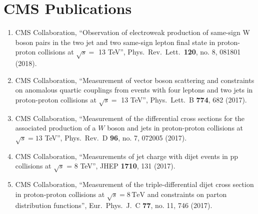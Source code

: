 \section*{CMS Publications}%
\begin{enumerate}
\item CMS Collaboration, ``Observation of electroweak production of same-sign W boson pairs in the two jet and two same-sign lepton final state in proton-proton collisions at $\sqrt{s} = $ 13 TeV'', Phys.\ Rev.\ Lett.\  {\bf 120}, no. 8, 081801 (2018).

\item CMS Collaboration, ``Measurement of vector boson scattering and constraints on anomalous quartic couplings from events with four leptons and two jets in proton-proton collisions at $\sqrt{s}=$ 13 TeV'', Phys.\ Lett.\ B {\bf 774}, 682 (2017).

\item CMS Collaboration, ``Measurement of the differential cross sections for the associated production of a $W$ boson and jets in proton-proton collisions at $\sqrt{s}=13$ TeV'', Phys.\ Rev.\ D {\bf 96}, no. 7, 072005 (2017).

\item CMS Collaboration, ``Measurements of jet charge with dijet events in pp collisions at $\sqrt{s}$ = 8 TeV'', JHEP {\bf 1710}, 131 (2017).

\item CMS Collaboration, ``Measurement of the triple-differential dijet cross section in proton-proton collisions at $\sqrt{s}=8\,\text {TeV} $ and constraints on parton distribution functions'', Eur.\ Phys.\ J.\ C {\bf 77}, no. 11, 746 (2017).


\end{enumerate}
